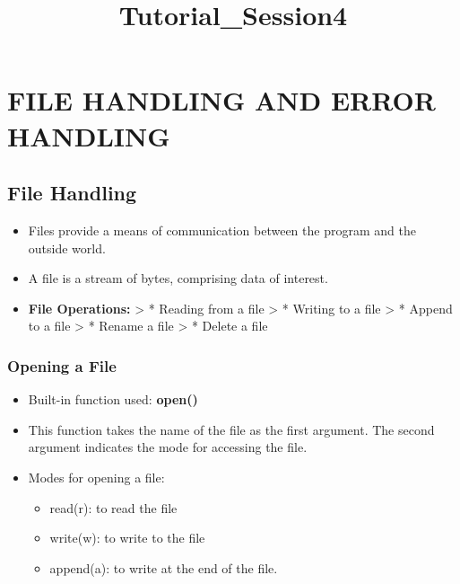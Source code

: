 \documentclass[11pt]{article}
\title{Tutorial\_Session4}
\providecommand{\tightlist}{%
      \setlength{\itemsep}{0pt}\setlength{\parskip}{0pt}}
\begin{document}
    
    
    \maketitle
    
    

    
    \section{ FILE HANDLING AND ERROR HANDLING
}\label{file-handling-and-error-handling}

    \subsection{ File Handling }\label{file-handling}

\begin{itemize}
\tightlist
\item
  Files provide a means of communication between the program and the
  outside world.
\item
  A file is a stream of bytes, comprising data of interest.
\item
  \textbf{File Operations:} \textgreater{} * Reading from a file
  \textgreater{} * Writing to a file \textgreater{} * Append to a file
  \textgreater{} * Rename a file \textgreater{} * Delete a file
\end{itemize}

    \subsubsection{ Opening a File }\label{opening-a-file}

\begin{itemize}
\tightlist
\item
  Built-in function used: \textbf{open()}
\item
  This function takes the name of the file as the first argument. The
  second argument indicates the mode for accessing the file.
\item
  Modes for opening a file:

  \begin{itemize}
  \tightlist
  \item
    read(r): to read the file
  \item
    write(w): to write to the file
  \item
    append(a): to write at the end of the file.
  \end{itemize}
\end{itemize}
\end{document}
